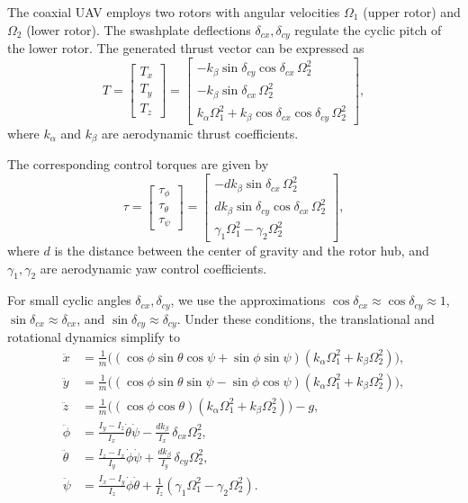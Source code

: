 The coaxial UAV employs two rotors with angular velocities $\Omega_1$ (upper rotor) and $\Omega_2$ (lower rotor). The swashplate deflections $\delta_{cx}, \delta_{cy}$ regulate the cyclic pitch of the lower rotor. The generated thrust vector can be expressed as
\begin{equation}
T =
\begin{bmatrix}
T_x \\ T_y \\ T_z
\end{bmatrix}
=
\begin{bmatrix}
- k_\beta \sin \delta_{cy} \cos \delta_{cx} \, \Omega_2^2 \\
- k_\beta \sin \delta_{cx} \, \Omega_2^2 \\
k_\alpha \Omega_1^2 + k_\beta \cos \delta_{cx} \cos \delta_{cy} \, \Omega_2^2
\end{bmatrix},
\end{equation}
where $k_\alpha$ and $k_\beta$ are aerodynamic thrust coefficients.

The corresponding control torques are given by
\begin{equation}
\tau =
\begin{bmatrix}
\tau_\phi \\ \tau_\theta \\ \tau_\psi
\end{bmatrix}
=
\begin{bmatrix}
- d k_\beta \sin \delta_{cx} \, \Omega_2^2 \\
d k_\beta \sin \delta_{cy} \cos \delta_{cx} \, \Omega_2^2 \\
\gamma_1 \Omega_1^2 - \gamma_2 \Omega_2^2
\end{bmatrix},
\end{equation}
where $d$ is the distance between the center of gravity and the rotor hub, and $\gamma_1,\gamma_2$ are aerodynamic yaw control coefficients.

For small cyclic angles $\delta_{cx}, \delta_{cy}$, we use the approximations $\cos \delta_{cx} \approx \cos \delta_{cy} \approx 1$, $\sin \delta_{cx} \approx \delta_{cx}$, and $\sin \delta_{cy} \approx \delta_{cy}$. Under these conditions, the translational and rotational dynamics simplify to
\begin{align}
\ddot{x} &= \frac{1}{m} \big( (\cos \phi \sin \theta \cos \psi + \sin \phi \sin \psi) (k_\alpha \Omega_1^2 + k_\beta \Omega_2^2) \big), \\
\ddot{y} &= \frac{1}{m} \big( (\cos \phi \sin \theta \sin \psi - \sin \phi \cos \psi) (k_\alpha \Omega_1^2 + k_\beta \Omega_2^2) \big), \\
\ddot{z} &= \frac{1}{m} \big( (\cos \phi \cos \theta)(k_\alpha \Omega_1^2 + k_\beta \Omega_2^2) \big) - g, \\
\ddot{\phi} &= \frac{I_y - I_z}{I_x}\dot{\theta}\dot{\psi} - \frac{d k_\beta}{I_x} \, \delta_{cx}\Omega_2^2, \\
\ddot{\theta} &= \frac{I_z - I_x}{I_y}\dot{\phi}\dot{\psi} + \frac{d k_\beta}{I_y} \, \delta_{cy}\Omega_2^2, \\
\ddot{\psi} &= \frac{I_x - I_y}{I_z}\dot{\phi}\dot{\theta} + \frac{1}{I_z} (\gamma_1 \Omega_1^2 - \gamma_2 \Omega_2^2).
\end{align}

